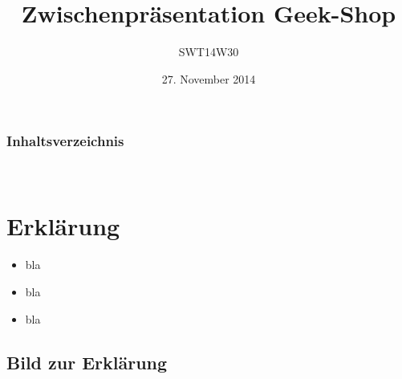 \documentclass{beamer}
\begin{document}
\title{Zwischenpr\"asentation Geek-Shop}
\author{SWT14W30}
\date{27. November 2014}

\begin{frame}
\titlepage
\end{frame}

\begin{frame}
\frametitle{Inhaltsverzeichnis}\
\tableofcontents
\end{frame}

\section{Erkl\"arung}
\begin{frame}
\begin{itemize}
\item bla
\item bla
\item bla
\end{itemize}
\end{frame}

\subsection{Bild zur Erkl\"arung}
\begin{frame}
\end{frame}
\end{document}
